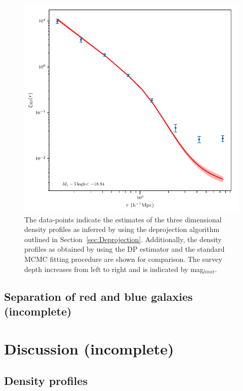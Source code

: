 \documentclass[a4paper,fleqn,usenatbib]{mnras}
\begin{document}
\begin{figure}
    \includegraphics[width= \textwidth]{deprojection.pdf}
\caption{The data-points indicate the estimates of the three dimensional density profiles as inferred by using the deprojection algorithm outlined in Section~\ref{sec:Deprojection}. Additionally, the density profiles as obtained by using the DP estimator and the standard MCMC fitting procedure are shown for comparison. The survey depth increases from left to right and is indicated by mag$_{limit}$.}
   \label{fig:deprojection} 
\end{figure}




\subsection{Separation of red and blue galaxies (incomplete)}


\section{Discussion (incomplete)}

\subsection{Density profiles}
\end{document}
